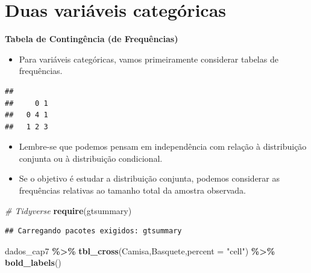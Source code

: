 \documentclass[
]{book}
\newenvironment{Shaded}{\begin{snugshade}}{\end{snugshade}}
\newcommand{\AttributeTok}[1]{\textcolor[rgb]{0.13,0.29,0.53}{#1}}
\newcommand{\CommentTok}[1]{\textcolor[rgb]{0.56,0.35,0.01}{\textit{#1}}}
\newcommand{\FunctionTok}[1]{\textcolor[rgb]{0.13,0.29,0.53}{\textbf{#1}}}
\newcommand{\NormalTok}[1]{#1}
\newcommand{\OtherTok}[1]{\textcolor[rgb]{0.56,0.35,0.01}{#1}}
\newcommand{\SpecialCharTok}[1]{\textcolor[rgb]{0.81,0.36,0.00}{\textbf{#1}}}
\newcommand{\StringTok}[1]{\textcolor[rgb]{0.31,0.60,0.02}{#1}}
\providecommand{\tightlist}{%
  \setlength{\itemsep}{0pt}\setlength{\parskip}{0pt}}
\begin{document}
\section{Duas variáveis categóricas}\label{duas-variuxe1veis-categuxf3ricas}

\textbf{Tabela de Contingência (de Frequências)}

\begin{itemize}
\tightlist
\item
  Para variáveis categóricas, vamos primeiramente considerar tabelas de frequências.
\end{itemize}

\begin{Shaded}
\end{Shaded}

\begin{verbatim}
##    
##     0 1
##   0 4 1
##   1 2 3
\end{verbatim}

\begin{itemize}
\item
  Lembre-se que podemos pensam em independência com relação à distribuição conjunta ou à distribuição condicional.
\item
  Se o objetivo é estudar a distribuição conjunta, podemos considerar as frequências relativas ao tamanho total da amostra observada.
\end{itemize}

\begin{Shaded}
\begin{Highlighting}[]
\CommentTok{\# Tidyverse}
\FunctionTok{require}\NormalTok{(gtsummary)}
\end{Highlighting}
\end{Shaded}

\begin{verbatim}
## Carregando pacotes exigidos: gtsummary
\end{verbatim}

\begin{Shaded}
\begin{Highlighting}[]
\NormalTok{dados\_cap7 }\SpecialCharTok{\%\textgreater{}\%} \FunctionTok{tbl\_cross}\NormalTok{(Camisa,Basquete,}\AttributeTok{percent =} \StringTok{"cell"}\NormalTok{) }\SpecialCharTok{\%\textgreater{}\%} 
  \FunctionTok{bold\_labels}\NormalTok{()}
\end{Highlighting}
\end{Shaded}
\end{document}
